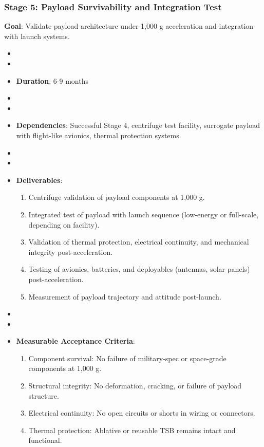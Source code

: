 \subsubsection{Stage 5: Payload Survivability and Integration Test}
\textbf{Goal}: Validate payload architecture under 1,000 g acceleration and integration with launch systems.
\begin{itemize}
    \item \item \item \textbf{Duration}: 6-9 months
    \item \item \item \textbf{Dependencies}: Successful Stage 4, centrifuge test facility, surrogate payload with flight-like avionics, thermal protection systems.
    \item \item \item \textbf{Deliverables}:
        \begin{enumerate}
            \item Centrifuge validation of payload components at 1,000 g.
            \item Integrated test of payload with launch sequence (low-energy or full-scale, depending on facility).
            \item Validation of thermal protection, electrical continuity, and mechanical integrity post-acceleration.
            \item Testing of avionics, batteries, and deployables (antennas, solar panels) post-acceleration.
            \item Measurement of payload trajectory and attitude post-launch.
        \end{enumerate}
    \item \item \item \textbf{Measurable Acceptance Criteria}:
        \begin{enumerate}
            \item Component survival: No failure of military-spec or space-grade components at 1,000 g.
            \item Structural integrity: No deformation, cracking, or failure of payload structure.
            \item Electrical continuity: No open circuits or shorts in wiring or connectors.
            \item Thermal protection: Ablative or reusable TSB remains intact and functional.

\end{enumerate}
\end{itemize}
